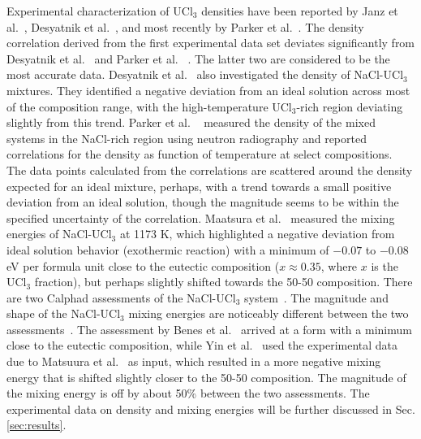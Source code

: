 \documentclass[preprint,3p,10pt,onecolumn,number,sort&compress]{elsarticle}
\begin{document}
Experimental characterization of UCl$_3$ densities have been reported by Janz et al.~\cite{Janz1988}, Desyatnik et al.~\cite{Desyatnik}, and most recently by Parker et al.~\cite{Parker}. The density correlation derived from the first experimental data set deviates significantly from Desyatnik et al.~\cite{Desyatnik} and Parker et al. ~\cite{Parker}. The latter two are considered to be the most accurate data.
Desyatnik et al.~\cite{Desyatnik} also investigated the density of NaCl-UCl$_3$ mixtures. They identified a negative deviation from an ideal solution across most of the composition range, with the high-temperature UCl$_3$-rich region deviating slightly from this trend. Parker et al. ~\cite{Parker} measured the density of the mixed systems in the NaCl-rich region using neutron radiography and reported correlations for the density as function of temperature at select compositions. The data points calculated from the correlations are scattered around the density expected for an ideal mixture, perhaps, with a trend towards a small positive deviation from an ideal solution, though the magnitude seems to be within the specified uncertainty of the correlation. %
Maatsura et al.~\cite{Matsuura} measured the mixing energies of NaCl-UCl$_3$ at 1173 K, which highlighted a negative deviation from ideal solution behavior (exothermic reaction) with a minimum of $-0.07$ to $-0.08$ eV per formula unit close to the eutectic composition ($x\approx 0.35$, where $x$ is the UCl$_3$ fraction), but perhaps slightly shifted towards the 50-50 composition. There are two Calphad assessments of the NaCl-UCl$_3$ system~\cite{BENES2008, YIN2020}. The magnitude and shape of the NaCl-UCl$_3$ mixing energies are noticeably different between the two assessments~\cite{YIN2020}. The assessment by Benes et al.~\cite{BENES2008} arrived at a form with a minimum close to the eutectic composition, while Yin et al.~\cite{YIN2020} used the experimental data due to Matsuura et al.~\cite{Matsuura} as input, which resulted in a more negative mixing energy that is shifted slightly closer to the 50-50 composition. The magnitude of the mixing energy is off by about 50\% between the two assessments. The experimental data on density and mixing energies will be further discussed in Sec. \ref{sec:results}.
\end{document}

